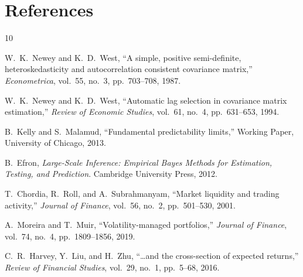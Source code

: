 \documentclass[11pt,a4paper]{article}
\theoremstyle{definition}
\begin{document}
\section*{References}

\begin{thebibliography}{10}

W.~K.~Newey and K.~D.~West,
``A simple, positive semi-definite, heteroskedasticity and autocorrelation
consistent covariance matrix,''
\emph{Econometrica}, vol.~55, no.~3, pp.~703--708, 1987.

W.~K.~Newey and K.~D.~West,
``Automatic lag selection in covariance matrix estimation,''
\emph{Review of Economic Studies}, vol.~61, no.~4, pp.~631--653, 1994.

B.~Kelly and S.~Malamud,
``Fundamental predictability limits,''
Working Paper, University of Chicago, 2013.

B.~Efron,
\emph{Large-Scale Inference: Empirical Bayes Methods for Estimation,
Testing, and Prediction}.
Cambridge University Press, 2012.

T.~Chordia, R.~Roll, and A.~Subrahmanyam,
``Market liquidity and trading activity,''
\emph{Journal of Finance}, vol.~56, no.~2, pp.~501--530, 2001.

A.~Moreira and T.~Muir,
``Volatility-managed portfolios,''
\emph{Journal of Finance}, vol.~74, no.~4, pp.~1809--1856, 2019.

C.~R.~Harvey, Y.~Liu, and H.~Zhu,
``\dots and the cross-section of expected returns,''
\emph{Review of Financial Studies}, vol.~29, no.~1, pp.~5--68, 2016.

\end{thebibliography}
\end{document}
